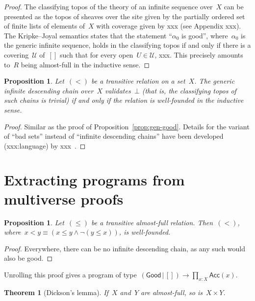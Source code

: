 \documentclass[oneside,reqno]{amsart}
\theoremstyle{definition}
\theoremstyle{plain}
\newtheorem{prop}[defn]{Proposition}
\newtheorem{thm}[defn]{Theorem}
\theoremstyle{remark}
\newcommand{\U}{\mathcal{U}}
\renewcommand{\_}{\mathpunct{.}\,}
\newcommand{\?}{\,{:}\,}
\begin{document}
\begin{proof}The classifying topos of the theory of an infinite sequence
over~$X$ can be presented as the topos of sheaves over the site given by the
partially ordered set of finite lists of elements of~$X$ with coverage given
by xxx (see Appendix xxx). The Kripke--Joyal semantics states that the
statement ``$\alpha_0$ is good'', where~$\alpha_0$ is the generic infinite
sequence, holds in the classifying topos if and only if there is a
covering~$\U$ of~$[]$ such that for every open~$U \in \U$, xxx. This precisely
amounts to~$R$ being almost-full in the inductive sense.
\end{proof}

\begin{prop}Let~$({<})$ be a transitive relation on a set~$X$. The generic
infinite descending chain over~$X$ validates~$\bot$ (that is, the classifying
topos of such chains is trivial) if and only if the relation is well-founded in
the inductive sense.\end{prop}

\begin{proof}Similar as the proof of Proposition~\ref{prop:gen-good}. Details
for the variant of ``bad sets'' instead of ``infinite descending chains'' have
been developed (xxx:language) by xxx~\cite{xxx}.\end{proof}


\section{Extracting programs from multiverse proofs}
\label{sect:program-extraction}

\begin{prop}Let~$({\leq})$ be a transitive almost-full relation.
Then~$({<})$, where~$x < y \equiv (x \leq y \wedge \neg(y \leq x))$,
is well-founded.\end{prop}

\begin{proof}Everywhere, there can be no infinite descending chain, as any
such would also be good.\end{proof}

Unrolling this proof gives a program of type~$(\textsf{Good} \,|\, []) \to
\prod_{x:X} \textsf{Acc}(x)$.

\begin{thm}[Dickson's lemma] If~$X$ and~$Y$ are almost-full,
so is~$X \times Y$.\end{thm}
\end{document}

